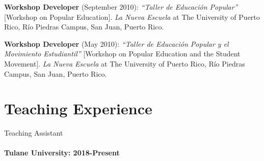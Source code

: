 \documentclass[11pt,a4paper,]{awesome-cv}
\begin{document}
\textbf{Workshop Developer} (September 2010): \emph{``Taller de
Educación Popular''} {[}Workshop on Popular Education{]}. \emph{La Nueva
Escuela} at The University of Puerto Rico, Río Piedras Campus, San Juan,
Puerto Rico.

\textbf{Workshop Developer} (May 2010): \emph{``Taller de Educación
Popular y el Movimiento Estudiantil''} {[}Workshop on Popular Education
and the Student Movement{]}. \emph{La Nueva Escuela} at The University
of Puerto Rico, Río Piedras Campus, San Juan, Puerto Rico.

\hypertarget{teaching-experience}{%
\section{\texorpdfstring{ Teaching
Experience}{ Teaching Experience}}\label{teaching-experience}}

Teaching Assistant

\hypertarget{tulane-university-2018-present}{%
\paragraph{Tulane University:
2018-Present}\label{tulane-university-2018-present}}
\end{document}
